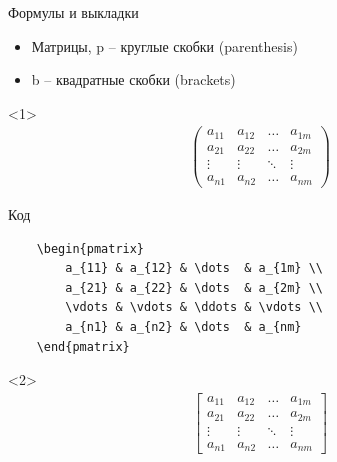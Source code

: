 \begin{frame}[fragile]{Формулы и выкладки}

\begin{itemize}[<+->]
    \item Матрицы, p -- круглые скобки (parenthesis)
    \item b -- квадратные скобки (brackets)
\end{itemize}

\vspace{-0.7cm}

\begin{onlyenv}<1>
    \begin{align*}
        \begin{pmatrix}
            a_{11} & a_{12} & \dots  & a_{1m} \\
            a_{21} & a_{22} & \dots  & a_{2m} \\
            \vdots & \vdots & \ddots & \vdots \\
            a_{n1} & a_{n2} & \dots  & a_{nm}
        \end{pmatrix}
    \end{align*}
    
    \vspace{-0.3cm}
    
    \begin{block}{Код}
        \begin{lstlisting}
    \begin{pmatrix}
        a_{11} & a_{12} & \dots  & a_{1m} \\
        a_{21} & a_{22} & \dots  & a_{2m} \\
        \vdots & \vdots & \ddots & \vdots \\
        a_{n1} & a_{n2} & \dots  & a_{nm}
    \end{pmatrix}
        \end{lstlisting}
    \end{block}
\end{onlyenv}

\begin{onlyenv}<2>
    \begin{align*}
        \begin{bmatrix}
            a_{11} & a_{12} & \dots  & a_{1m} \\
            a_{21} & a_{22} & \dots  & a_{2m} \\
            \vdots & \vdots & \ddots & \vdots \\
            a_{n1} & a_{n2} & \dots  & a_{nm}
        \end{bmatrix}
    \end{align*}
    

\end{onlyenv}
\end{frame}
